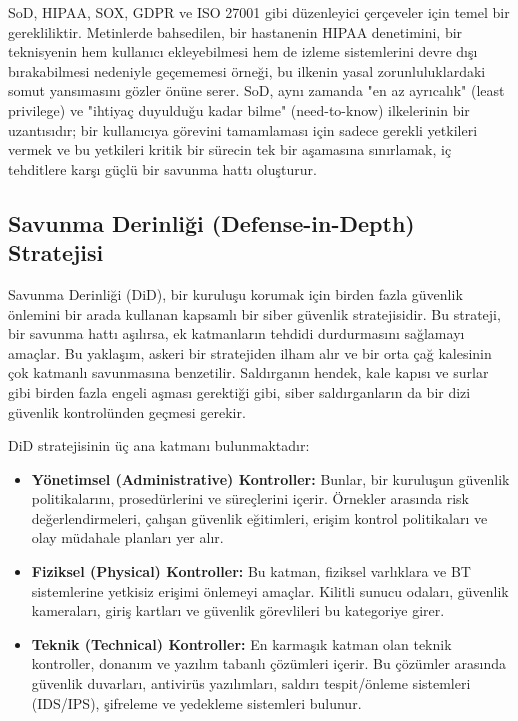 SoD, HIPAA, SOX, GDPR ve ISO 27001 gibi düzenleyici çerçeveler için temel bir gerekliliktir. Metinlerde bahsedilen, bir hastanenin HIPAA denetimini, bir teknisyenin hem kullanıcı ekleyebilmesi hem de izleme sistemlerini devre dışı bırakabilmesi nedeniyle geçememesi örneği, bu ilkenin yasal zorunluluklardaki somut yansımasını gözler önüne serer. SoD, aynı zamanda "en az ayrıcalık" (least privilege) ve "ihtiyaç duyulduğu kadar bilme" (need-to-know) ilkelerinin bir uzantısıdır; bir kullanıcıya görevini tamamlaması için sadece gerekli yetkileri vermek ve bu yetkileri kritik bir sürecin tek bir aşamasına sınırlamak, iç tehditlere karşı güçlü bir savunma hattı oluşturur.

\subsection{Savunma Derinliği (Defense-in-Depth) Stratejisi}

Savunma Derinliği (DiD), bir kuruluşu korumak için birden fazla güvenlik önlemini bir arada kullanan kapsamlı bir siber güvenlik stratejisidir. Bu strateji, bir savunma hattı aşılırsa, ek katmanların tehdidi durdurmasını sağlamayı amaçlar. Bu yaklaşım, askeri bir stratejiden ilham alır ve bir orta çağ kalesinin çok katmanlı savunmasına benzetilir. Saldırganın hendek, kale kapısı ve surlar gibi birden fazla engeli aşması gerektiği gibi, siber saldırganların da bir dizi güvenlik kontrolünden geçmesi gerekir.

DiD stratejisinin üç ana katmanı bulunmaktadır:

\begin{itemize}
    \item \textbf{Yönetimsel (Administrative) Kontroller:} Bunlar, bir kuruluşun güvenlik politikalarını, prosedürlerini ve süreçlerini içerir. Örnekler arasında risk değerlendirmeleri, çalışan güvenlik eğitimleri, erişim kontrol politikaları ve olay müdahale planları yer alır.
    \item \textbf{Fiziksel (Physical) Kontroller:} Bu katman, fiziksel varlıklara ve BT sistemlerine yetkisiz erişimi önlemeyi amaçlar. Kilitli sunucu odaları, güvenlik kameraları, giriş kartları ve güvenlik görevlileri bu kategoriye girer.
    \item \textbf{Teknik (Technical) Kontroller:} En karmaşık katman olan teknik kontroller, donanım ve yazılım tabanlı çözümleri içerir. Bu çözümler arasında güvenlik duvarları, antivirüs yazılımları, saldırı tespit/önleme sistemleri (IDS/IPS), şifreleme ve yedekleme sistemleri bulunur.
\end{itemize}

